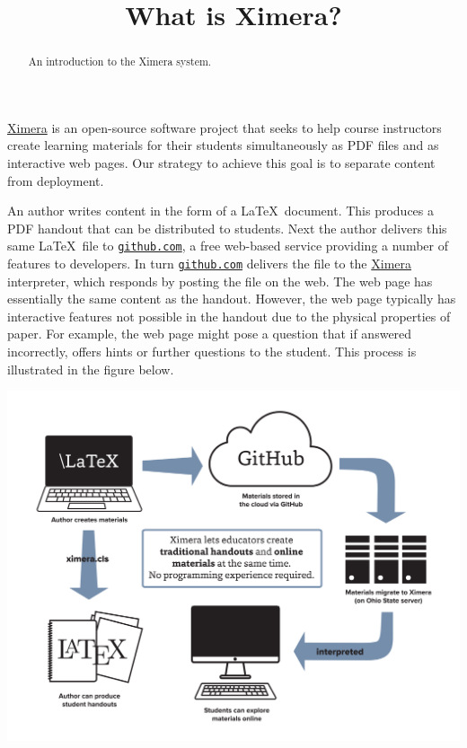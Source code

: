 \documentclass{ximera}
\title{What is Ximera?}
\begin{document}
\begin{abstract}
An introduction to the Ximera system.
\end{abstract}
\maketitle

\href{http://ximera.osu.edu}{\sf Ximera}
is an open-source software project that
seeks to help course instructors create learning materials
for their students simultaneously as PDF files and as interactive
web pages. Our strategy to achieve this goal is to separate
content from deployment.

An author writes content in the form of a \LaTeX\ document.
This produces a PDF handout that can be distributed to students.
Next the author delivers this same \LaTeX\ file to
\href{http://github.com}{\tt github.com},
a free web-based service providing a number of features to developers.
In turn \href{http://github.com}{\tt github.com} delivers
the file to the \href{http://ximera.osu.edu}{\sf Ximera}
interpreter, which responds by posting the file on the web.
The web page has essentially the same content as the handout.
However, the web page typically has interactive features
not possible in the handout due to the physical properties of paper.
For example, the web page might pose a question
that if answered incorrectly, offers hints or further questions
to the student.
This process is illustrated in the figure below.

\begin{image}
\includegraphics[scale=.25]{XimeraGraphic.png}
\end{image}
\end{document}
